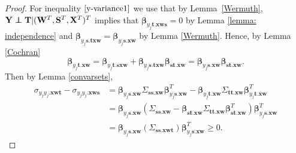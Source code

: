 \documentclass[11pt,a4paper]{article}
\theoremstyle{definition}
\theoremstyle{remark}
\newcommand\ci{\protect\mathpalette{\protect\independenT}{\perp}}
\def\independenT#1#2{\mathrel{\rlap{$#1#2$}\mkern2mu{#1#2}}}
\begin{document}
\begin{proof}
For inequality $\ref{y-variance1}$ we use that by Lemma~\ref{Wermuth}, $\mathbf{Y} \ci \mathbf{T} | (\mathbf{W}^T, \mathbf{S}^T , \mathbf{X}^T)^T$ implies that
$\boldsymbol{\beta}_{y_j\mathbf{t}.\mathbf{xws}} = 0$ by Lemma \ref{lemma: independence} and $\boldsymbol{\beta}_{y_j\mathbf{s}.\mathbf{txw}} = \boldsymbol{\beta}_{y_j\mathbf{s}.\mathbf{xw}}$ by Lemma \ref{Wermuth}. Hence, by Lemma \ref{Cochran}
\[
\boldsymbol{\beta}_{y_j\mathbf{t}.\mathbf{xw}} = \boldsymbol{\beta}_{y_j\mathbf{t}.\mathbf{sxw}} + \boldsymbol{\beta}_{y_j\mathbf{s}.\mathbf{txw}}
\boldsymbol{\beta}_{\mathbf{st}.\mathbf{xw}} =
\boldsymbol{\beta}_{y_j\mathbf{s}.\mathbf{xw}} 
\boldsymbol{\beta}_{\mathbf{st}.\mathbf{xw}}.
\]
Then by Lemma \ref{convarsets},
\begin{align}
\sigma_{y_jy_j.\mathbf{xwt}} - \sigma_{y_jy_j.\mathbf{xws}} &=\boldsymbol{\beta}_{y_j\mathbf{s}.\mathbf{xw}} \Sigma_{\mathbf{ss}.\mathbf{xw}} \boldsymbol{\beta}^T_{y_j\mathbf{s}.\mathbf{xw}} -
\boldsymbol{\beta}_{y_j\mathbf{t}.\mathbf{xw}} \Sigma_{\mathbf{tt}.\mathbf{xw}} \boldsymbol{\beta}^T_{y_j\mathbf{t}.\mathbf{xw}} \nonumber\\
&= \boldsymbol{\beta}_{y_j\mathbf{s}.\mathbf{xw}}( \Sigma_{\mathbf{ss}.\mathbf{xw}} - \boldsymbol{\beta}_{\mathbf{st}.\mathbf{xw}} \Sigma_{\mathbf{tt}.\mathbf{xw}} \boldsymbol{\beta}_{\mathbf{st}.\mathbf{xw}}^T)\boldsymbol{\beta}^T_{y_j\mathbf{s}.\mathbf{xw}} \nonumber\\
&=  \boldsymbol{\beta}_{y_j\mathbf{s}.\mathbf{xw}}(\Sigma_{\mathbf{ss}.\mathbf{xwt}})\boldsymbol{\beta}^T_{y_j\mathbf{s}.\mathbf{xw}} \geq 0. \label{y_variance_calc}
\end{align} 


\end{proof}
\end{document}
